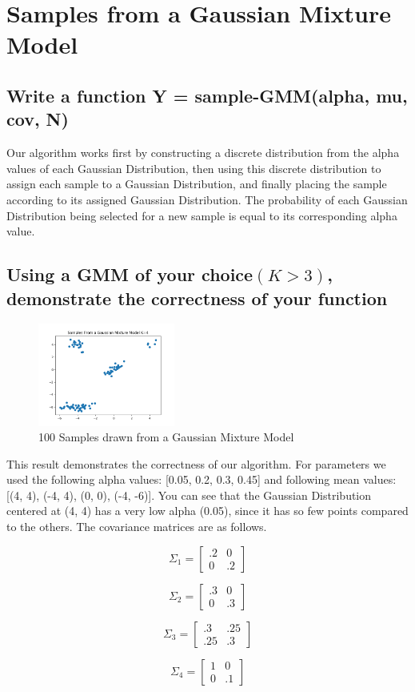\documentclass[a4paper]{article}
\begin{document}
        \clearpage
	\section{Samples from a Gaussian Mixture Model}
	\subsection{Write a function Y = sample-GMM(alpha, mu, cov, N)}

	Our algorithm works first by constructing a discrete distribution from the alpha values of each Gaussian Distribution, then using this discrete distribution to assign each sample to a Gaussian Distribution, and finally placing the sample according to its assigned Gaussian Distribution.  The probability of each Gaussian Distribution being selected for a new sample is equal to its corresponding alpha value.

	\subsection{Using a GMM of your choice$ (K > 3)$, demonstrate the correctness of your function}

	\begin{figure}[h]
			\begin{center}
				\includegraphics[width=0.4\textwidth]{GMM_samples.png}
				\caption{100 Samples drawn from a Gaussian Mixture Model}
			\end{center}
		\end{figure}

	This result demonstrates the correctness of our algorithm.  For parameters we used the following alpha values: [0.05, 0.2, 0.3, 0.45] and following mean values: [(4, 4), (-4, 4), (0, 0), (-4, -6)].  You can see that the Gaussian Distribution centered at (4, 4) has a very low alpha (0.05), since it has so few points compared to the others.  The covariance matrices are as follows.

	\[
	\Sigma_1 =
 	\begin{bmatrix}
  	.2 & 0 \\
  	0 & .2
 	\end{bmatrix}
 	\]

	\[
	\Sigma_2 =
 	\begin{bmatrix}
  	.3 & 0 \\
  	0 & .3
 	\end{bmatrix}
 	\]

	\[
	\Sigma_3 =
 	\begin{bmatrix}
  	.3 & .25 \\
  	.25 & .3
 	\end{bmatrix}
 	\]

 	\[
 	\Sigma_4 =
 	\begin{bmatrix}
  	1 & 0 \\
  	0 & .1
 	\end{bmatrix}
	\]
\end{document}

